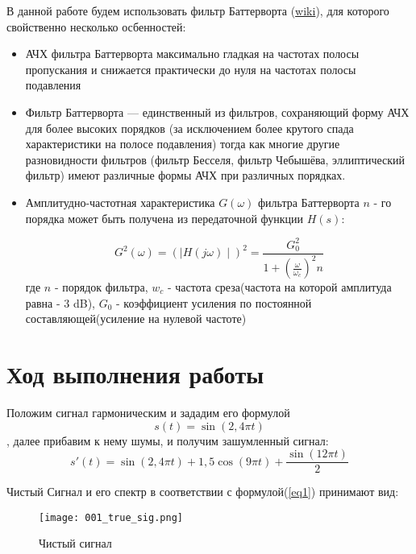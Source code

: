 В данной работе будем использовать фильтр Баттерворта 
(\href{https://ru.wikipedia.org/wiki/%D0%A4%D0%B8%D0%BB%D1%8C%D1%82%D1%80_%D0%91%D0%B0%D1%82%D1%82%D0%B5%D1%80%D0%B2%D0%BE%D1%80%D1%82%D0%B0}{wiki}), для которого свойственно несколько осбенностей:
\begin{itemize}
\item АЧХ фильтра Баттерворта максимально гладкая на частотах полосы пропускания и снижается практически до нуля на частотах полосы подавления

\item Фильтр Баттерворта — единственный из фильтров, сохраняющий форму АЧХ для более высоких порядков (за исключением более крутого спада характеристики на полосе подавления) тогда как многие другие разновидности фильтров (фильтр Бесселя, фильтр Чебышёва, эллиптический фильтр) имеют различные формы АЧХ при различных порядках.

\item Амплитудно-частотная характеристика $ G(\omega ) $  фильтра Баттерворта $ n $ - го порядка может быть получена из передаточной функции $ H(s)$:

$$ G^2(\omega) = (\mid H(j \omega) \mid)^2  = \frac{G_0^2}{1 + (\frac{\omega}{\omega_c})^2n}   $$
где $n$ - порядок фильтра, $ w_c $ - частота среза(частота на которой амплитуда равна - 3 dB), $ G_0 $ - коэффициент усиления по постоянной составляющей(усиление на нулевой частоте)
\end{itemize}
 


\section{Ход выполнения работы}
Положим сигнал гармоническим и зададим его формулой 
\begin{equation}\label{eq1} 
	s(t) = \sin(2,4 \pi t)  
\end{equation}, далее прибавим к нему шумы, и получим зашумленный сигнал:
\begin{equation}\label{eq2} 
	s'(t) = \sin(2,4 \pi t) + 1,5 \cos(9 \pi t) + \frac{\sin(12 \pi t)}{2} 
\end{equation}

Чистый Сигнал и его спектр в соответствии с формулой(\ref{eq1}) принимают вид:

\begin{figure}[H]
	\begin{center}
		\texttt{[image: 001\_true\_sig.png]}
		\caption{Чистый сигнал} 
		\label{pic:pic01} %
	\end{center}
\end{figure} 
 
